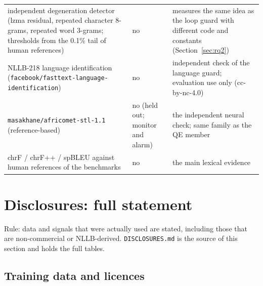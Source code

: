 \begin{table}[t]
\begin{tabularx}{\linewidth}{@{}>{\raggedright\arraybackslash}X>{\raggedright\arraybackslash}X>{\raggedright\arraybackslash}X@{}}
independent degeneration detector (lzma residual, repeated character 8-grams, repeated word 3-grams; thresholds from the 0.1\% tail of human references) & no & measures the same idea as the loop guard with different code and constants (Section~\ref{sec:rq2}) \\
NLLB-218 language identification (\texttt{facebook/\allowbreak{}fasttext-\allowbreak{}language-\allowbreak{}identification}) & no & independent check of the language guard; evaluation use only (cc-by-nc-4.0) \\
\texttt{masakhane/\allowbreak{}africomet-\allowbreak{}stl-\allowbreak{}1.\allowbreak{}1} (reference-based) & no (held out; monitor and alarm) & the independent neural check; same family as the QE member \\
chrF / chrF++ / spBLEU against human references of the benchmarks & no & the main lexical evidence \\
\bottomrule
\end{tabularx}
\end{table}

\section{Disclosures: full statement}\label{app:disc}

Rule: data and signals that were actually used are stated, including those that are non-commercial or NLLB-derived. \texttt{DISCLOSURES.\allowbreak{}md} is the source of this section and holds the full tables. 

\subsection{Training data and licences}


